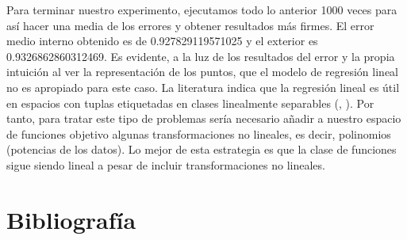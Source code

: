 Para terminar nuestro experimento, ejecutamos todo lo anterior 1000 veces para así hacer una media de los errores y obtener resultados más firmes. El error medio interno obtenido es de 0.927829119571025 y el exterior es  0.9326862860312469. Es evidente, a la luz de los resultados del error y la propia intuición al ver la representación de los puntos, que el modelo de regresión lineal no es apropiado para este caso. La literatura indica que la regresión lineal es útil en espacios con tuplas etiquetadas en clases linealmente separables (\cite{lfd}, \cite{ctm}). Por tanto, para tratar este tipo de problemas sería necesario añadir a nuestro espacio de funciones objetivo algunas transformaciones no lineales, es decir, polinomios (potencias de los datos). Lo mejor de esta estrategia es que la clase de funciones sigue siendo lineal a pesar de incluir transformaciones no lineales.
\newpage
\section{Bibliografía}




